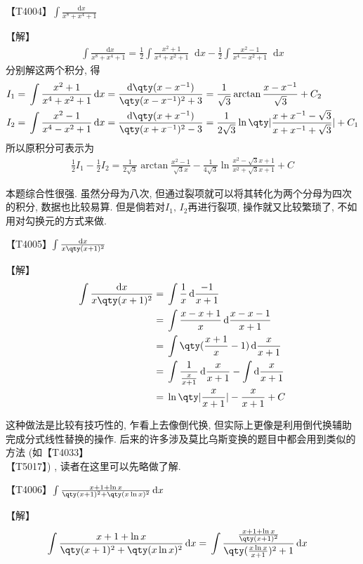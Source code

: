 \documentclass{ctexbook}
\newcommand*{\dif}{\mathop{}\!\mathrm{d}}
\begin{document}
{【T4004】$\int\frac{\dif{x}}{x^{8}+x^{4}+1}$\par
【解】
\begin{align*}
\int\frac{\dif{x}}{x^{8}+x^{4}+1}=\frac{1}{2}\int\frac{x^{2}+1}{x^{4}+x^{2}+1}\dif{x}-\frac{1}{2}\int\frac{x^{2}-1}{x^{4}-x^{2}+1}\dif{x}
\end{align*}
分别解这两个积分, 得
\begin{align*}
I_{1}={}&\int\frac{x^{2}+1}{x^{4}+x^{2}+1}\dif{x}=\frac{\dif{\qty(x-x^{-1})}}{\qty(x-x^{-1})^{2}+3}
=\frac{1}{\sqrt{3}}\arctan{\frac{x-x^{-1}}{\sqrt{3}}}+C_{2}\\
I_{2}={}&\int\frac{x^{2}-1}{x^{4}-x^{2}+1}\dif{x}=\frac{\dif{\qty(x+x^{-1})}}{\qty(x+x^{-1})^{2}-3}=\frac{1}{2\sqrt{3}}\ln\qty|\frac{x+x^{-1}-\sqrt{3}}{x+x^{-1}+\sqrt{3}}|+C_{1}
\end{align*}
所以原积分可表示为
\begin{align*}
\frac{1}{2}I_{1}-\frac{1}{2}I_{2}=\frac{1}{2\sqrt{3}}\arctan{\frac{x^{2}-1}{\sqrt{3}x}}-\frac{1}{4\sqrt{3}}\ln{\frac{x^{2}-\sqrt{3}x+1}{x^{2}+\sqrt{3}x+1}}+C
\end{align*}\par
{\kaishu 本题综合性很强. 虽然分母为八次, 但通过裂项就可以将其转化为两个分母为四次的积分, 数据也比较易算. 但是倘若对$I_{1},\,I_{2}$再进行裂项, 操作就又比较繁琐了, 不如用对勾换元的方式来做. \par}
【T4005】$\int\frac{\dif{x}}{x\qty(x+1)^{2}}$\par
【解】
\begin{align*}
\int\frac{\dif{x}}{x\qty(x+1)^{2}}={}&\int\frac{1}{x}\dif{\frac{-1}{x+1}}\\
={}&\int\frac{x-x+1}{x}\dif{\frac{x-x-1}{x+1}}\\
={}&\int\qty(\frac{x+1}{x}-1)\dif{\frac{x}{x+1}}\\
={}&\int\frac{1}{\frac{x}{x+1}}\dif{\frac{x}{x+1}}-\int\dif{\frac{x}{x+1}}\\
={}&\ln\qty|\frac{x}{x+1}|-\frac{x}{x+1}+C
\end{align*}\par
{\kaishu 这种做法是比较有技巧性的, 乍看上去像倒代换, 但实际上更像是利用倒代换辅助完成分式线性替换的操作. 后来的许多涉及莫比乌斯变换的题目中都会用到类似的方法 (如【T4033】\\【T5017】) , 读者在这里可以先略做了解. \par}
【T4006】$\int\frac{x+1+\ln{x}}{\qty(x+1)^{2}+\qty(x\ln{x})^{2}}\dif{x}$\par
【解】
\begin{align*}
\int\frac{x+1+\ln{x}}{\qty(x+1)^{2}+\qty(x\ln{x})^{2}}\dif{x}={}&\int\frac{\frac{x+1+\ln{x}}{\qty(x+1)^{2}}}{\qty(\frac{x\ln{x}}{x+1})^{2}+1}\dif{x}

\end{align*}}
\end{document}
